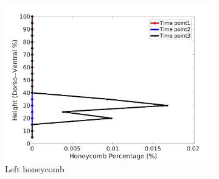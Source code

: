 \begin{figure}[H]
\begin{subfigure}{.42\linewidth}
  \includegraphics[width=\linewidth,trim={{.0\wd0} {.0\wd0} {.0\wd0} {.0\wd0}},clip]{Appendix/Image_AppexA/DorsoToVentral/IPF6LeftLungHoneycombDiseaseDorsoToVentral.jpg} %
  \caption{Left honeycomb}
  \label{fig:IPF6DiseaseDorsoToVentral-e} 
\end{subfigure} 
\begin{subfigure}{.42\linewidth}%

\end{subfigure}
\end{figure}
